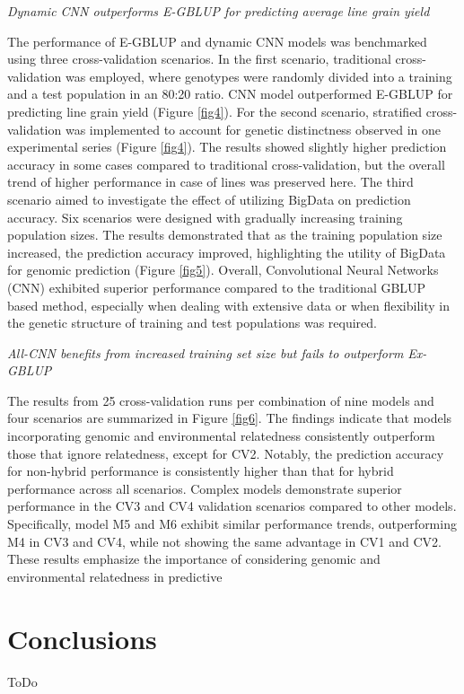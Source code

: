 \documentclass[english, biblatex]{lni}
\begin{document}
\textit{Dynamic CNN outperforms E-GBLUP for predicting average line grain yield} 

The performance of E-GBLUP and dynamic CNN models was benchmarked using three cross-validation scenarios. In the first scenario, traditional cross-validation was employed, where genotypes were randomly divided into a training and a test population in an 80:20 ratio. CNN model outperformed E-GBLUP for predicting line grain yield (Figure \ref{fig4}). For the second scenario, stratified cross-validation was implemented to account for genetic distinctness observed in one experimental series (Figure \ref{fig4}). The results showed slightly higher prediction accuracy in some cases compared to traditional cross-validation, but the overall trend of higher performance in case of lines was preserved here. The third scenario aimed to investigate the effect of utilizing BigData on prediction accuracy. Six scenarios were designed with gradually increasing training population sizes. The results demonstrated that as the training population size increased, the prediction accuracy improved, highlighting the utility of BigData for genomic prediction (Figure \ref{fig5}). Overall, Convolutional Neural Networks (CNN) exhibited superior performance compared to the traditional GBLUP based method, especially when dealing with extensive data or when flexibility in the genetic structure of training and test populations was required.

\textit{All-CNN benefits from increased training set size but fails to outperform Ex-GBLUP} 

The results from 25 cross-validation runs per combination of nine models and four scenarios are summarized in Figure \ref{fig6}. The findings indicate that models incorporating genomic and environmental relatedness consistently outperform those that ignore relatedness, except for CV2. Notably, the prediction accuracy for non-hybrid performance is consistently higher than that for hybrid performance across all scenarios. Complex models demonstrate superior performance in the CV3 and CV4 validation scenarios compared to other models. Specifically, model M5 and M6 exhibit similar performance trends, outperforming M4 in CV3 and CV4, while not showing the same advantage in CV1 and CV2. These results emphasize the importance of considering genomic and environmental relatedness in predictive

\section{Conclusions}

ToDo

\printbibliography%
\end{document}
